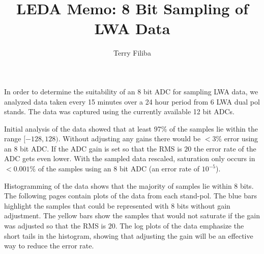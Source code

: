 \documentclass[fleqn, onecolumn]{article}
\begin{document}
\title{LEDA Memo: 8 Bit Sampling of LWA Data}
\date{}
\author{Terry Filiba}
\maketitle

In order to determine the suitability of an 8 bit ADC for sampling LWA data, we analyzed data taken every 15 minutes over a 24 hour period from 6 LWA dual pol stands. The data was captured using the currently available 12 bit ADCs.

Initial analysis of the data showed that at least 97\% of the samples lie within the range $[-128,128)$. Without adjusting any gains there would be $< 3\%$ error using an 8 bit ADC.
If the ADC gain is set so that the RMS is $20$ the error rate of the ADC gets even lower. With the sampled data rescaled, saturation only occurs in $<0.001\%$ of the samples using an 8 bit ADC (an error rate of $10^{-5}$). 

\begin{table}[h]

\end{table}

Histogramming of the data shows that the majority of samples lie within 8 bits. 
The following pages contain plots of the data from each stand-pol. 
The blue bars highlight the samples that could be represented with 8 bits without gain adjustment. 
The yellow bars show the samples that would not saturate if the gain was adjusted so that the RMS is $20$.
The log plots of the data emphasize the short tails in the histogram, showing that adjusting the gain will be an effective way to reduce the error rate. 

\end{document}
